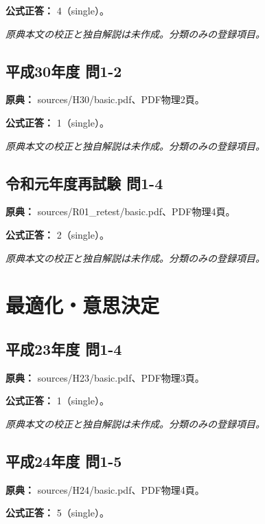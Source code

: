 \textbf{公式正答：} 4（single）。

\par\textit{原典本文の校正と独自解説は未作成。分類のみの登録項目。}

\subsection{平成30年度 問1-2}
\label{q:h30-reg-basic-1-2}

\noindent\textbf{原典：} sources/H30/basic.pdf、PDF物理2頁。

\textbf{公式正答：} 1（single）。

\par\textit{原典本文の校正と独自解説は未作成。分類のみの登録項目。}

\subsection{令和元年度再試験 問1-4}
\label{q:r01-ret-basic-1-4}

\noindent\textbf{原典：} sources/R01\_retest/basic.pdf、PDF物理4頁。

\textbf{公式正答：} 2（single）。

\par\textit{原典本文の校正と独自解説は未作成。分類のみの登録項目。}

\section{最適化・意思決定}

\subsection{平成23年度 問1-4}
\label{q:h23-reg-basic-1-4}

\noindent\textbf{原典：} sources/H23/basic.pdf、PDF物理3頁。

\textbf{公式正答：} 1（single）。

\par\textit{原典本文の校正と独自解説は未作成。分類のみの登録項目。}

\subsection{平成24年度 問1-5}
\label{q:h24-reg-basic-1-5}

\noindent\textbf{原典：} sources/H24/basic.pdf、PDF物理4頁。

\textbf{公式正答：} 5（single）。

